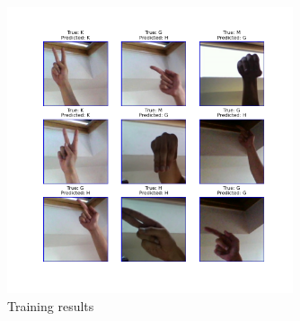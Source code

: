 \documentclass{scrartcl}
\begin{document}
  \begin{figure}[ht]
    \centering
    \includegraphics[width=0.75\textwidth]{../figures/trained_model_results.png}
    \caption{Training results}
    \label{fig:training_results}
  \end{figure}

\printbibliography
\end{document}
